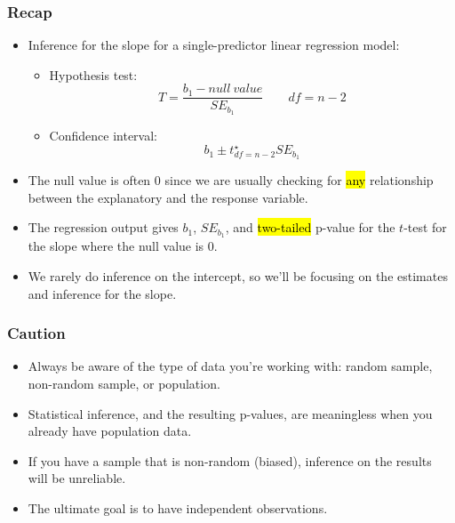 \begin{frame}
\frametitle{Recap}

\begin{itemize}

\item Inference for the slope for a single-predictor linear regression model:
\pause
\begin{itemize}
\item Hypothesis test:
\[ T = \frac{b_1 - null~value}{SE_{b_1}} \qquad df = n - 2 \]
\pause
\item Confidence interval:
\[ b_1 \pm t^\star_{df = n - 2} SE_{b_1} \]
\end{itemize}

\pause

\item The null value is often 0 since we are usually checking for \hl{any} relationship between the explanatory and the response variable.

\pause

\item The regression output gives $b_1$, $SE_{b_1}$, and \hl{two-tailed} p-value for the $t$-test for the slope where the null value is 0.

\pause

\item We rarely do inference on the intercept, so we'll be focusing on the estimates and inference for the slope.

\end{itemize}

\end{frame}



\begin{frame}
\frametitle{Caution}

\begin{itemize}

\item Always be aware of the type of data you're working with: random sample, non-random sample, or population.

\pause

\item Statistical inference, and the resulting p-values, are meaningless when you already have population data.

\pause

\item If you have a sample that is non-random (biased), inference on the results will be unreliable.

\pause

\item The ultimate goal is to have independent observations.

\end{itemize}

\end{frame}

